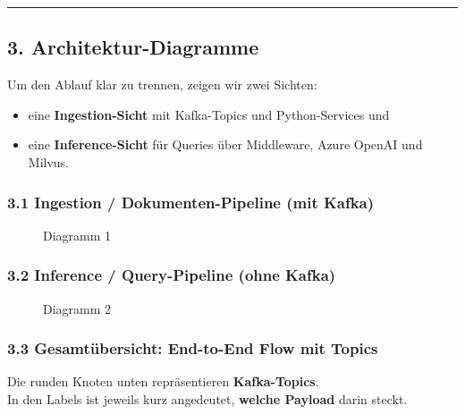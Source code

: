 \begin{center}\rule{0.5\linewidth}{0.5pt}\end{center}

\subsection{3. Architektur-Diagramme}\label{architektur-diagramme}

Um den Ablauf klar zu trennen, zeigen wir zwei Sichten:

\begin{itemize}
\tightlist
\item
  eine \textbf{Ingestion-Sicht} mit Kafka-Topics und Python-Services und
\item
  eine \textbf{Inference-Sicht} für Queries über Middleware, Azure
  OpenAI und Milvus.
\end{itemize}

\subsubsection{3.1 Ingestion / Dokumenten-Pipeline (mit
Kafka)}\label{ingestion-dokumenten-pipeline-mit-kafka}

\begin{figure}
\centering
\pandocbounded{}
\caption{Diagramm 1}
\end{figure}

\subsubsection{3.2 Inference / Query-Pipeline (ohne
Kafka)}\label{inference-query-pipeline-ohne-kafka}

\begin{figure}
\centering
\pandocbounded{}
\caption{Diagramm 2}
\end{figure}

\subsubsection{3.3 Gesamtübersicht: End-to-End Flow mit
Topics}\label{gesamtuxfcbersicht-end-to-end-flow-mit-topics}

Die runden Knoten unten repräsentieren \textbf{Kafka-Topics}.\\
In den Labels ist jeweils kurz angedeutet, \textbf{welche Payload} darin
steckt.


